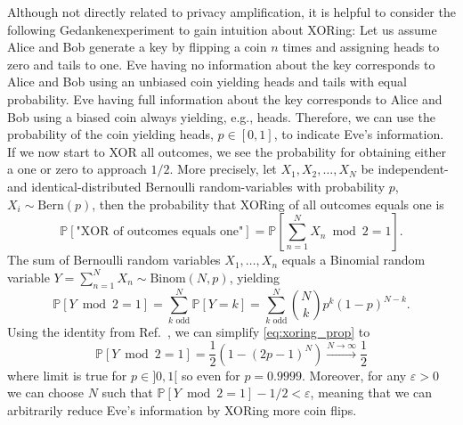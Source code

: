 Although not directly related to privacy amplification, it is helpful to consider the following Gedankenexperiment to gain intuition about XORing:
Let us assume Alice and Bob generate a key by flipping a coin $n$ times and assigning heads to zero and tails to one.
Eve having no information about the key corresponds to Alice and Bob using an unbiased coin yielding heads and tails with equal probability.
Eve having full information about the key corresponds to Alice and Bob using a biased coin always yielding, e.g., heads.
Therefore, we can use the probability of the coin yielding heads, $p\in[0,1]$, to indicate Eve's information.
If we now start to XOR all outcomes, we see the probability for obtaining either a one or zero to approach $1/2$.
More precisely, let $X_1,X_2,\dots,X_N$ be independent- and identical-distributed Bernoulli random-variables with probability $p$, $X_i\sim\text{Bern}(p)$, then the probability that XORing of all outcomes equals one is
\begin{equation}
	\mathbb{P}\left[
		\text{"XOR of outcomes equals one"}
	\right]
	=
	\mathbb{P}\left[
		\sum_{n=1}^NX_n\bmod2
		=
		1
	\right]
	.
\end{equation}
The sum of Bernoulli random variables $X_1,\dots,X_n$ equals a Binomial random variable $Y=\sum_{n=1}^NX_n\sim\text{Binom}(N,p)$, yielding
\begin{equation}
	\mathbb{P}\left[
		Y\bmod2
		=
		1
	\right]
	=
	\sum^N_{k\text{ odd}}
	\mathbb{P}\left[Y=k\right]
	=
	\sum^N_{k\text{ odd}}
	\binom{N}{k}
	p^k(1-p)^{N-k}
	\label{eq:xoring_prop}
	.
\end{equation}
Using the identity from Ref.~\cite{stackexchange2528974}, we can simplify \cref{eq:xoring_prop} to
\begin{equation}
	\mathbb{P}\left[
		Y\bmod2
		=
		1
	\right]
	=
	\frac{1}{2}
	\left(
		1-(2p-1)^N
	\right)
	\xrightarrow{N\to\infty}
	\frac{1}{2}
\end{equation}
where limit is true for $p\in]0,1[$ so even for $p=0.9999$.
Moreover, for any $\varepsilon>0$ we can choose $N$ such that $\mathbb{P}\left[Y\bmod2=1\right]-1/2<\varepsilon$, meaning that we can arbitrarily reduce Eve's information by XORing more coin flips.

